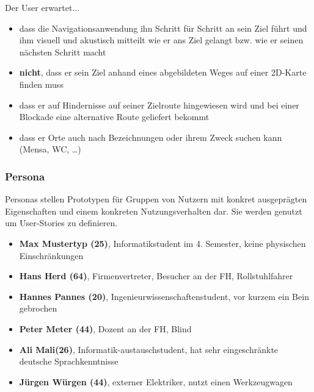 \noindent Der User erwartet...
\begin{itemize}
  \item dass die Navigationsanwendung ihn Schritt für Schritt an sein Ziel führt und ihm visuell und akustisch mitteilt wie er ans Ziel gelangt bzw. wie er seinen nächsten Schritt macht
  \item \textbf{nicht}, dass er sein Ziel anhand eines abgebildeten Weges auf einer 2D-Karte finden muss
  \item dass er auf Hindernisse auf seiner Zielroute hingewiesen wird und bei einer Blockade eine alternative Route geliefert bekommt
  \item dass er Orte auch nach Bezeichnungen oder ihrem Zweck suchen kann (Mensa, WC, \dots)
\end{itemize}

\subsubsection*{Persona}
Personas stellen Prototypen für Gruppen von Nutzern mit konkret ausgeprägten Eigenschaften und einem konkreten Nutzungsverhalten dar. Sie werden genutzt um User-Stories zu definieren.

\begin{itemize}
  \item \textbf{Max Mustertyp (25)}, Informatikstudent im 4. Semester, keine physischen Einschränkungen
  \item \textbf{Hans Herd (64)}, Firmenvertreter, Besucher an der FH, Rollstuhlfahrer
  \item \textbf{Hannes Pannes (20)}, Ingenieurwissenschaftenstudent, vor kurzem ein Bein gebrochen
  \item \textbf{Peter Meter (44)}, Dozent an der FH, Blind
  \item \textbf{Ali Mali(26)}, Informatik-austauschstudent, hat sehr eingeschränkte deutsche Sprachkenntnisse
  \item \textbf{Jürgen Würgen (44)}, externer Elektriker, nutzt einen Werkzeugwagen 
\end{itemize}

